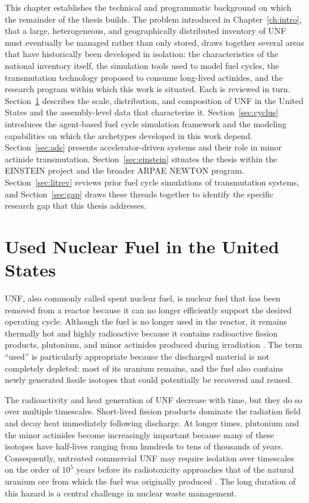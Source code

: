 This chapter establishes the technical and programmatic background on which
the remainder of the thesis builds. The problem introduced in
Chapter~\ref{ch:intro}, that a large, heterogeneous, and geographically
distributed inventory of \gls{UNF} must eventually be managed rather than only
stored, draws together several areas that have historically been developed
in isolation: the characteristics of the national inventory itself, the
simulation tools used to model fuel cycles, the transmutation technology
proposed to consume long-lived actinides, and the research program within
which this work is situated. Each is reviewed in turn.
Section~\ref{sec:unf} describes the scale, distribution, and composition of
\gls{UNF} in the United States and the assembly-level data that characterize
it. Section~\ref{sec:cyclus} introduces the \Cyclus agent-based fuel cycle
simulation framework and the modeling capabilities on which the archetypes
developed in this work depend. Section~\ref{sec:ads} presents
accelerator-driven systems and their role in minor actinide transmutation.
Section~\ref{sec:einstein} situates the thesis within the \gls{EINSTEIN}
project and the broader \gls{ARPAE} \gls{NEWTON} program.
Section~\ref{sec:litrev} reviews prior fuel cycle simulations of
transmutation systems, and Section~\ref{sec:gap} draws these threads together
to identify the specific research gap that this thesis addresses.


\section{Used Nuclear Fuel in the United States}
\label{sec:unf}

\gls{UNF}, also commonly called spent nuclear fuel, is nuclear
fuel that has been removed from a reactor because it can no longer efficiently
support the desired operating cycle. Although the fuel is no longer used in
the reactor, it remains thermally hot and highly radioactive because it
contains radioactive fission products, plutonium, and minor actinides produced
during irradiation \cite{nrc_high_level_waste}. The term ``used'' is
particularly appropriate because the discharged material is not completely
depleted: most of its uranium remains, and the fuel also contains newly
generated fissile isotopes that could potentially be recovered and reused.

The radioactivity and heat generation of \gls{UNF} decrease with time, but they do
so over multiple timescales. Short-lived fission products dominate the
radiation field and decay heat immediately following discharge. At longer
times, plutonium and the minor actinides become increasingly important because
many of these isotopes have half-lives ranging from hundreds to tens of
thousands of years. Consequently, untreated commercial \gls{UNF} may require
isolation over timescales on the order of \(10^{5}\) years before its
radiotoxicity approaches that of the natural uranium ore from which the fuel
was originally produced \cite{arpa_e_newton_2025}. The long duration of this
hazard is a central challenge in nuclear waste management.

